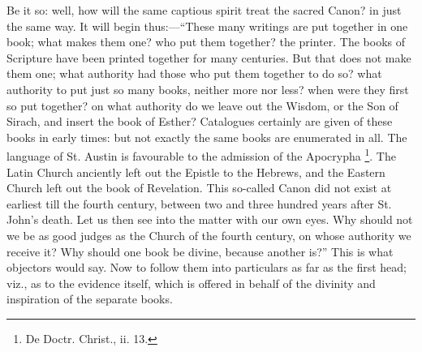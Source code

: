 Be it so: well, how will the same captious spirit treat the sacred
Canon? in just the same way. It will begin thus:—``These many
writings are put together in one book; what makes them one? who put
them together? the printer. The books of Scripture have been printed
together for many centuries. But that does not make them one; what
authority had those who put them together to do so? what authority to
put just so many books, neither more nor less? when were they first so
put together? on what authority do we leave out the Wisdom, or the Son
of Sirach, and insert the book of Esther? Catalogues certainly are
given of these books in early times: but not exactly the same books
are enumerated in all. The language of St. Austin is favourable to the
admission of the Apocrypha \footnote{De Doctr. Christ., ii. 13.}.
The Latin Church anciently left out the Epistle to the Hebrews, and
the Eastern Church left out the book of Revelation. This so-called
Canon did not exist at earliest till the fourth century, between two
and three hundred years after St. John's death. Let us then see into
the matter with our own eyes. Why should not we be as good judges as
the Church of the fourth century, on whose authority we receive it?
Why should one book be divine, because another is?'' This is what
objectors would say. Now to follow them into particulars as far
as the first head; viz., as to the evidence itself, which is offered
in behalf of the divinity and inspiration of the separate books.

